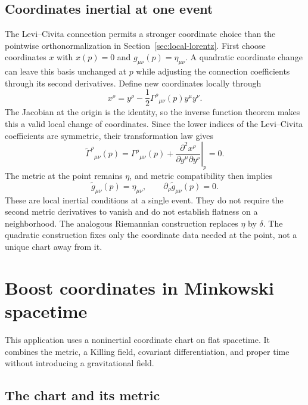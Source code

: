 \documentclass[11pt,a4paper]{article}
\numberwithin{equation}{section}
\begin{document}
\subsection{Coordinates inertial at one event}
\label{sec:inertial-point}

The Levi--Civita connection permits a stronger coordinate choice than the
pointwise orthonormalization in Section~\ref{sec:local-lorentz}. First choose
coordinates \(x\) with \(x(p)=0\) and \(g_{\mu\nu}(p)=\eta_{\mu\nu}\).
A quadratic coordinate change can leave this basis unchanged at \(p\)
while adjusting the connection coefficients through its second derivatives.
Define new coordinates locally through
\[
 x^\rho=y^\rho-\frac12\Gamma^\rho{}_{\mu\nu}(p)y^\mu y^\nu.
\]
The Jacobian at the origin is the identity, so the inverse function theorem
makes this a valid local change of coordinates. Since the lower indices of
the Levi--Civita coefficients are symmetric, their transformation law gives
\[
 \widetilde\Gamma^\rho{}_{\mu\nu}(p)
 =\Gamma^\rho{}_{\mu\nu}(p)
   +\left.\frac{\partial^2x^\rho}{\partial y^\mu\partial y^\nu}\right|_p
 =0.
\]
The metric at the point remains \(\eta\), and metric compatibility then
implies
\[
 \widetilde g_{\mu\nu}(p)=\eta_{\mu\nu},\qquad
 \partial_\rho\widetilde g_{\mu\nu}(p)=0.
\]
These are local inertial conditions at a single event. They do not require
the second metric derivatives to vanish and do not establish flatness on a
neighborhood. The analogous Riemannian construction replaces \(\eta\) by
\(\delta\). The quadratic construction fixes only the coordinate data needed
at the point, not a unique chart away from it.

\section{Boost coordinates in Minkowski spacetime}
\label{sec:boost-app}

This application uses a noninertial coordinate chart on flat spacetime.
It combines the metric, a Killing field, covariant differentiation, and
proper time without introducing a gravitational field.

\subsection{The chart and its metric}
\end{document}
